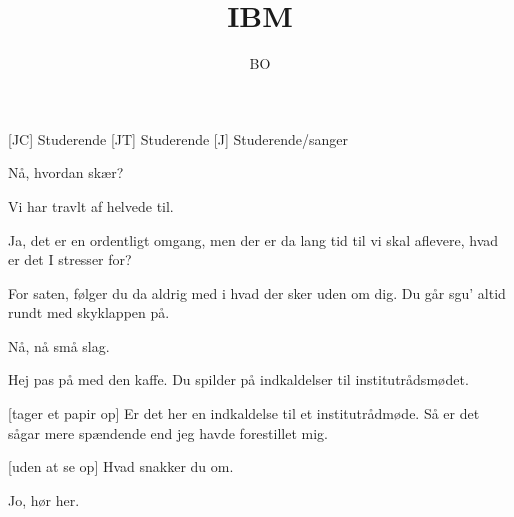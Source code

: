 \documentclass[a4paper,11pt]{article}
\title{IBM}
\author{BO}
\begin{document}
\maketitle

\begin{roles}
[JC] Studerende
[JT] Studerende
[J] Studerende/sanger
\end{roles}

\begin{sketch}



 Nå, hvordan skær?

 Vi har travlt af helvede til.

 Ja, det er en ordentligt omgang, men der er da lang tid til vi skal aflevere, hvad er det I stresser for?

 For saten, følger du da aldrig med i hvad der sker uden om dig.  Du går sgu' altid rundt med skyklappen på.

 Nå, nå små slag. 

 Hej pas på med den kaffe.  Du spilder på indkaldelser til institutrådsmødet.

[tager et papir op] Er det her en indkaldelse til et institutrådmøde.  Så er det sågar mere spændende end jeg havde forestillet mig.

[uden at se op] Hvad snakker du om.

 Jo, hør her.

\end{sketch}
\end{document}
